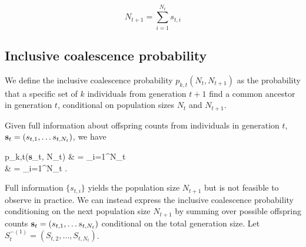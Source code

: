 \documentclass{article}
\let\oldalign\align
\let\oldendalign\endalign
\renewenvironment{align}{\linenomathNonumbers\oldalign}{\oldendalign\endlinenomath}
\begin{document}
\begin{equation}
N_{t+1}=\sum_{i=1}^{N_t} s_{t,i}
\label{eq:summation}
\end{equation}

\subsection{Inclusive coalescence probability}

We define the inclusive coalescence probability $p_{k,t}(N_t, N_{t+1})$ as the probability that a specific set of $k$ individuals from generation $t+1$ find a common ancestor in generation $t$, conditional on population sizes $N_t$ and $N_{t+1}$.

Given full information about offspring counts from individuals in generation $t$, ${\bf s}_t = (s_{t,1}, \dots s_{t, N_t})$, we have

{\allowdisplaybreaks
	\begin{align}
		p_{k,t}({\bf s}_t, N_t)
			& = \sum_{i=1}^{N_t}  \nonumber\\
			& = \sum_{i=1}^{N_t} .%
	\end{align}
}

Full information $\{s_{t,i}\}$ yields the population size $N_{t+1}$ but is not feasible to observe in practice.
We can instead express the inclusive coalescence probability conditioning on the next population size $N_{t+1}$ by summing over possible offspring counts ${\bf s}_t = (s_{t,1}, \dots s_{t, N_t})$ conditional on the total generation size.
Let $S_t^{-(1)} = (S_{t,2}, \dots, S_{t, N_t})$.
\end{document}
